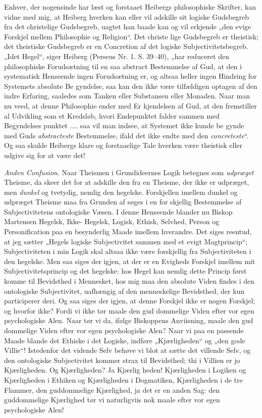 \documentclass[12pt]{book}
\newcommand{\opage}[1]{\marginnote{\footnotesize\textit{[#1]}}}
\begin{document}
Enhver, der nogensinde har læst og forstaaet Heibergs
philosophiske Skrifter, kan vidne med mig, at Heiberg hverken
kan eller vil adskille sit logiske Gudsbegreb fra det christelige
Gudsbegreb, uagtet han baade kan og vil erkjende „den
evige Forskjel mellem Philosophie og Religion“. Det christe\-%
lige Gudsbegreb er theistisk; det theistiske Gudsbegreb er en
Concretion af det logiske Subjectivitetsbegreb. „Idet Hegel“,
siger Heiberg (Perseus Nr. 1. S. 39--40), „har reduceret
den philosophiske Forudsætning til en saa abstract Bestemmelse
af Gud, at den i systematisk Henseende ingen Forudsætning
er, og altsaa heller ingen Hindring for Systemets absolute Be\-%
gyndelse, saa kan den ikke være tilfældigen optagen af den indre
Erfaring, saaledes som Tanken eller Substansen eller Monaden.
Naar man nu veed, at denne Philosophie ender med Er\-%
kjendelsen af Gud, at den fremstiller al Udvikling som et
Kredsløb, hvori Endepunktet falder sammen med Begyndelses\-%
punktet .... saa vil man indsee, at Systemet ikke kunde be\-%
gynde med Guds \emph{abstracteste} Bestemmelse, ifald det ikke
endte med den \emph{concreteste}“. Og saa skulde Heibergs klare
og forstaaelige Tale hverken være theistisk eller udgive sig for
at være det!

\emph{Anden Confusion}. Naar Theismen i Grundideernes
Logik betegnes som \emph{udpræget} Theisme, da skeer det for at
adskille den fra en Theisme, der ikke er udpræget, men \emph{dunkel}
\opage{123}\setcounter{footnote}{0}%
og tvetydig, nemlig den hegelske. Forskjellen imellem dunkel
og udpræget Theisme maa fra Grunden af søges i en for\-%
skjellig Bestemmelse af Subjectivitetens ontologiske Væsen. I
denne Henseende blander nu Biskop Martensen Hegelsk, Ikke-%
Hegelsk, Logisk, Ethisk, Selvhed, Person og Personification paa
en besynderlig Maade imellem hverandre. Det siges reentud,
at jeg sætter „Hegels logiske Subjectivitet sammen med et
evigt Magtprincip“; Subjectiviteten i min Logik skal altsaa
ikke være forskjellig fra Subjectiviteten i den hegelske. Men
saa siges der igjen, at der er en Evigheds Forskjel imellem
mit Subjectivitetsprincip og det hegelske: hos Hegel kan nemlig
dette Princip først komme til Bevidsthed i Mennesket, hos mig
maa den absolute Viden findes i den ontologiske Subjectivitet,
uafhængig af den menneskelige Bevidsthed, der kun participerer
deri. Og saa siges der igjen, at denne Forskjel ikke er nogen
Forskjel; og hvorfor ikke? Fordi vi ikke tør maale den gud\-%
dommelige Viden efter vor egen psychologiske Alen. Naar
tør vi da, ifølge Biskoppens Anviisning, maale den gud\-%
dommelige Viden efter vor egen psychologiske Alen? Naar
vi paa en passende Maade blande det Ethiske i det Logiske,
indføre „Kjærligheden“ og „den gode Villie“! Istedenfor det
vidende Selv behøve vi blot at sætte det villende Selv, og
den ontologiske Subjectivitet kommer strax til Bevidsthed; thi i
Villien er jo Kjærligheden. Og Kjærligheden? Ja Kjærlig\-%
heden! Kjærligheden i Logiken og Kjærligheden i Ethiken og
Kjærligheden i Dogmatiken, Kjærligheden i de tre Flammer,
den guddommelige Kjærlighed, ja det er en anden Sag: den
guddommelige Kjærlighed tør vi naturligviis nok maale efter
vor egen psychologiske Alen!
\end{document}
